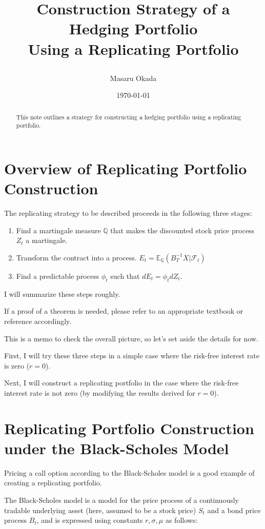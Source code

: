 \documentclass[uplatex,a4j,12pt,dvipdfmx]{jsarticle}
\title{
\begin{center}
	Construction Strategy of a Hedging Portfolio \\
	Using a Replicating Portfolio
\end{center}
}
\author{Masaru Okada}
\date{\today}
\begin{document}
\maketitle

\begin{abstract}
	This note outlines a strategy for constructing a hedging portfolio using a replicating portfolio.
\end{abstract}


\section{Overview of Replicating Portfolio Construction}
The replicating strategy to be described proceeds in the following three stages:
\begin{enumerate}
	\item Find a martingale measure $\mathbb{Q}$ that makes the discounted stock price process $Z_{t}$ a martingale.
	\item Transform the contract into a process. $E_{t} = \mathbb{E}_{\mathbb{Q}}(B^{-1}_{T} X | \mathcal{F}_{t})$
	\item Find a predictable process $\phi_{t}$ such that $dE_{t} = \phi_{t} d Z_{t}$.
\end{enumerate}

I will summarize these steps roughly.

If a proof of a theorem is needed, please refer to an appropriate textbook or reference accordingly.

This is a memo to check the overall picture, so let's set aside the details for now.

First, I will try these three steps in a simple case where the risk-free interest rate is zero ($r=0$).

Next, I will construct a replicating portfolio in the case where the risk-free interest rate is not zero (by modifying the results derived for $r=0$).

\section{Replicating Portfolio Construction under the Black-Scholes Model}

Pricing a call option according to the Black-Scholes model is a good example of creating a replicating portfolio.

The Black-Scholes model is a model for the price process of a continuously tradable underlying asset (here, assumed to be a stock price) $S_{t}$ and a bond price process $B_{t}$, and is expressed using constants $r, \sigma, \mu$ as follows:
\end{document}

